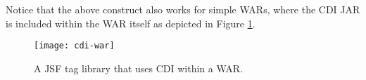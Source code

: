 Notice that the above construct also works for simple WARs, where the CDI JAR is included within the WAR itself as depicted in Figure \ref{fig:cdi-war}.
\begin{figure}[htbp]
	\begin{center}
		\texttt{[image: cdi-war]}
		\caption{A JSF tag library that uses CDI within a WAR.}
		\label{fig:cdi-war}
	\end{center}
\end{figure}